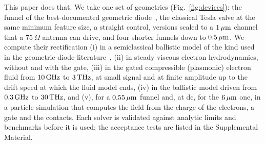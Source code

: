 This paper does that. We take one set of geometries
(Fig.~\ref{fig:devices}): the funnel of the best-documented geometric
diode~\cite{nguyen2021geometric}, the classical Tesla valve at the same
minimum feature size, a straight control, versions scaled to a $1\,\mu\mathrm{m}$
channel that a $75\ \Omega$ antenna can drive, and four shorter funnels
down to $0.5\,\mu\mathrm{m}$. We compute their rectification (i) in a semiclassical
ballistic model of the kind used in the geometric-diode
literature~\cite{zhu2013graphene,stearns2021simulation,truccolo2024comprehensive}, (ii) in
steady viscous electron hydrodynamics, without and with the gate, (iii) in
the gated compressible (plasmonic) electron fluid from $10\,\mathrm{GHz}$ to $3\,\mathrm{THz}$,
at small signal and at finite amplitude up to the drift speed at which
the fluid model ends, (iv)
in the ballistic model driven from $0.3\,\mathrm{GHz}$ to $30\,\mathrm{THz}$, and (v), for
a $0.55\,\mu\mathrm{m}$ funnel and, at dc, for the $6\,\mu\mathrm{m}$ one, in a particle
simulation that computes the field from the charge of the electrons, a
gate and the contacts. Each solver is
validated against analytic limits and benchmarks before it is used; the
acceptance tests are listed in the Supplemental Material.

